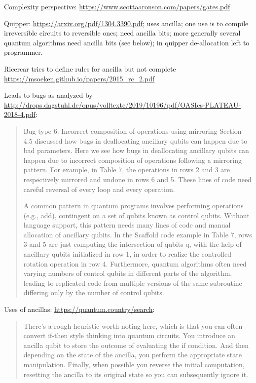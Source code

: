 \documentclass[sigplan,10pt,review,anonymous]{acmart}
\begin{document}
Complexity perspective:
\url{https://www.scottaaronson.com/papers/gates.pdf}

Quipper: \url{https://arxiv.org/pdf/1304.3390.pdf}; uses ancilla; one
use is to compile irreversible circuits to reversible ones; need
ancilla bits; more generally several quantum algorithms need ancilla
bits (see below); in quipper de-allocation left to programmer.

Ricercar tries to define rules for ancilla but not complete
\url{https://msoeken.github.io/papers/2015_rc_2.pdf}
 
Leads to bugs as analyzed by
\url{http://drops.dagstuhl.de/opus/volltexte/2019/10196/pdf/OASIcs-PLATEAU-2018-4.pdf}:

\begin{quote}

  Bug type 6: Incorrect composition of operations using mirroring Section 4.5 discussed how bugs in deallocating ancillary qubits can happen due to bad parameters. Here we see how bugs in deallocating ancillary qubits can happen due to incorrect composition of operations following a mirroring pattern. For example, in Table 7, the operations in rows 2 and 3 are respectively mirrored and undone in rows 6 and 5. These lines of code need careful reversal of every loop and every operation.

  A common pattern in quantum programs involves performing operations (e.g., add), contingent on a set of qubits known as control qubits. Without language support, this pattern needs many lines of code and manual allocation of ancillary qubits. In the Scaffold code example in Table 7, rows 3 and 5 are just computing the intersection of qubits q, with the help of ancillary qubits initialized in row 1, in order to realize the controlled rotation operation in row 4. Furthermore, quantum algorithms often need varying numbers of control qubits in different parts of the algorithm, leading to replicated code from multiple versions of the same subroutine differing only by the number of control qubits.

\end{quote}

Uses of ancillas:
\url{https://quantum.country/search}:

\begin{quote}
  There’s a rough heuristic worth noting here, which is that you can
  often convert if-then style thinking into quantum circuits. You
  introduce an ancilla qubit to store the outcome of evaluating the if
  condition. And then depending on the state of the ancilla, you
  perform the appropriate state manipulation. Finally, when possible
  you reverse the initial computation, resetting the ancilla to its
  original state so you can subsequently ignore it.
\end{quote}
\end{document}
